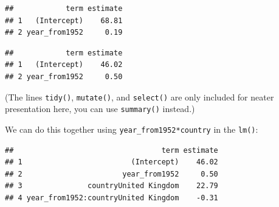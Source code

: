 \documentclass[]{book}
\makeatletter
\newenvironment{Shaded}{\begin{snugshade}}{\end{snugshade}}
\newcommand{\KeywordTok}[1]{\textcolor[rgb]{0.13,0.29,0.53}{\textbf{#1}}}
\newcommand{\DataTypeTok}[1]{\textcolor[rgb]{0.13,0.29,0.53}{#1}}
\newcommand{\DecValTok}[1]{\textcolor[rgb]{0.00,0.00,0.81}{#1}}
\newcommand{\StringTok}[1]{\textcolor[rgb]{0.31,0.60,0.02}{#1}}
\newcommand{\OperatorTok}[1]{\textcolor[rgb]{0.81,0.36,0.00}{\textbf{#1}}}
\newcommand{\NormalTok}[1]{#1}
\newenvironment{kframe}{%
\medskip{}
\setlength{\fboxsep}{.8em}
 \def\at@end@of@kframe{}%
 \ifinner\ifhmode%
  \def\at@end@of@kframe{\end{minipage}}%
  \begin{minipage}{\columnwidth}%
 \fi\fi%
 \def\FrameCommand##1{\hskip\@totalleftmargin \hskip-\fboxsep
 \colorbox{shadecolor}{##1}\hskip-\fboxsep
     \hskip-\linewidth \hskip-\@totalleftmargin \hskip\columnwidth}%
 \MakeFramed {\advance\hsize-\width
   \@totalleftmargin\z@ \linewidth\hsize
   \@setminipage}}%
 {\par\unskip\endMakeFramed%
 \at@end@of@kframe}
\renewenvironment{Shaded}{\begin{kframe}}{\end{kframe}}
\makeatother
\begin{document}
\begin{verbatim}
##            term estimate
## 1   (Intercept)    68.81
## 2 year_from1952     0.19
\end{verbatim}

\begin{Shaded}
\end{Shaded}

\begin{verbatim}
##            term estimate
## 1   (Intercept)    46.02
## 2 year_from1952     0.50
\end{verbatim}

(The lines \texttt{tidy()}, \texttt{mutate()}, and \texttt{select()} are
only included for neater presentation here, you can use
\texttt{summary()} instead.)

We can do this together using \texttt{year\_from1952*country} in the
\texttt{lm()}:

\begin{Shaded}
\end{Shaded}

\begin{verbatim}
##                                  term estimate
## 1                         (Intercept)    46.02
## 2                       year_from1952     0.50
## 3               countryUnited Kingdom    22.79
## 4 year_from1952:countryUnited Kingdom    -0.31
\end{verbatim}
\end{document}
